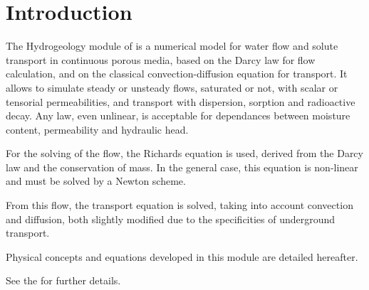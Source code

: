 
%
%
%
%



\section{Introduction}

The Hydrogeology module of \CS is a numerical model for water flow and solute
transport in continuous porous media,
based on the Darcy law for flow calculation, and on the classical
convection-diffusion equation for transport.
It allows to simulate steady or unsteady flows, saturated or not, with scalar or
tensorial permeabilities, and transport with dispersion, sorption and radioactive decay.
Any law, even unlinear, is acceptable for dependances between moisture content,
permeability and hydraulic head.

For the solving of the flow, the Richards equation is used, derived from the Darcy law and the conservation of mass.
In the general case, this equation is non-linear and must be solved by a Newton scheme.

From this flow, the transport equation is solved, taking into account convection and diffusion,
both slightly modified due to the specificities of underground transport.

Physical concepts and equations developed in this module are detailed hereafter.

See the  for further details.

